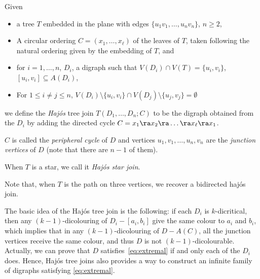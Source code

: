 \begin{definition}\label{def:HTJ}
Given
\begin{itemize}
    \item a tree $T$ embedded in the plane with edges $\{u_1v_1, \dots, u_nv_n\}$, $n \geq 2$, 
    \item A circular ordering $C=(x_1, \dots, x_{\ell})$ of the leaves of $T$, taken following the natural ordering given by the embedding of $T$,  and
    \item for $i=1, \dots, n$, $D_i$, a digraph such that $V(D_i) \cap V(T) = \{u_i,v_i\}$, $[u_i,v_i] \subseteq A(D_i)$, 
    \item For $1 \leq i \neq j \leq n$, $V(D_i) \setminus \{u_i, v_i\} \cap V(D_j) \setminus \{u_j, v_j\} = \emptyset$ %
\end{itemize} 

we define the \emph{Haj\'os} tree join $T(D_1, \dots, D_n; C)$ to be the digraph obtained from the $D_i$ by adding the directed cycle  $C = x_1 \ra x_2 \ra \dots \ra x_{\ell} \ra x_1$. 

$C$ is called the  \emph{peripheral cycle} of $D$ and  vertices $u_1, v_1, \dots, u_n,v_n$ are the \emph{junction vertices} of $D$ (note that there are $n-1$ of them). 

When $T$ is a star, we call it \emph{Haj\'os star join}. 
\end{definition}


Note that, when $T$ is the path on three vertices, we recover a bidirected haj\'os join. %
  



The basic idea of the Haj\'os tree join is the following: if each $D_i$ is $k$-dicritical, then any $(k-1)$-dicolouring of $D_i-[a_i,b_i]$ give the same colour to $a_i$ and $b_i$, which implies that in any $(k-1)$-dicolouring of $D-A(C)$, all the junction vertices receive the same colour, and thus $D$ is not $(k-1)$-dicolourable. 
Actually, we can prove that $D$ satisfies~\eqref{eq:extremal} if and only each of the $D_i$ does. Hence, Haj\'os tree joins also provides a way to construct an infinite family  of digraphs satisfying \eqref{eq:extremal}. 


